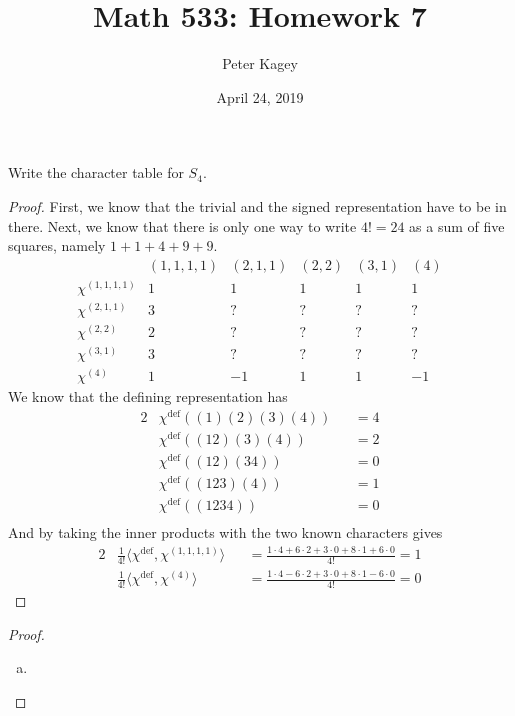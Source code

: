 \documentclass{article}
\newenvironment{problem}[2][Problem]{\begin{trivlist}
\item[\hskip \labelsep {\bfseries #1}\hskip \labelsep {\bfseries #2.}]}{\end{trivlist}}
\newcommand{\ang}[1]{\langle #1 \rangle}
\begin{document}
\title{Math 533: Homework 7}
\author{Peter Kagey}
\date{April 24, 2019}

\maketitle

\begin{problem}{1}
  Write the character table for $S_4$.
\end{problem}

\begin{proof}
  First, we know that the trivial and the signed representation have to be in
  there. Next, we know that there is only one way to write $4! = 24$ as a
  sum of five squares, namely $1 + 1 + 4 + 9 + 9$.
  \[
  \begin{array}{ l|rrrrr }
        & (1,1,1,1) & (2,1,1) & (2,2) & (3,1) & (4) \\
   \hline
   \chi^{(1,1,1,1)} & 1 &  1 & 1 &  1 &  1 \\
   \chi^{(2,1,1)}   & 3 & ? &  ? &  ? &  ? \\
   \chi^{(2,2)}     & 2 & ? &  ? &  ? &  ? \\
   \chi^{(3,1)}     & 3 & ? &  ? &  ? &  ? \\
   \chi^{(4)}       & 1 & -1 & 1 &  1 & -1
 \end{array}
  \]
  We know that the defining representation has \begin{alignat*}{2}
      &\chi^\text{def}((1)(2)(3)(4)) &&= 4 \\
      &\chi^\text{def}((12)(3)(4)) &&= 2 \\
      &\chi^\text{def}((12)(34)) &&= 0 \\
      &\chi^\text{def}((123)(4)) &&= 1 \\
      &\chi^\text{def}((1234)) &&= 0 \\
  \end{alignat*}
  And by taking the inner products with the two known characters gives \begin{alignat*}{2}
    &\frac{1}{4!}\ang{\chi^\text{def}, \chi^{(1,1,1,1)}} &&= \frac{
      1 \cdot 4 +
      6 \cdot 2 +
      3 \cdot 0 +
      8 \cdot 1 +
      6 \cdot 0
    }{4!} = 1 \\
    &\frac{1}{4!}\ang{\chi^\text{def}, \chi^{(4)}} &&= \frac{
      1 \cdot 4
      - 6 \cdot 2
      + 3 \cdot 0
      + 8 \cdot 1
      - 6 \cdot 0
    }{4!} = 0
  \end{alignat*}
\end{proof}
\pagebreak

\begin{problem}{3}
\end{problem}

\begin{proof} ~
  \begin{enumerate}[(a)]
    \item
  \end{enumerate}
\end{proof}
\end{document}
